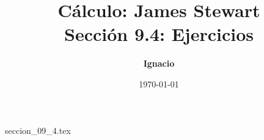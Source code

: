 \documentclass[11pt,spanish,oneside]{report}
\title{\textbf{Cálculo: James Stewart} \\ \Large Sección 9.4: Ejercicios}
\author{\textbf{Ignacio}}
\date{\today}
\begin{document}
\maketitle

{seccion_09_4.tex}
\end{document}
